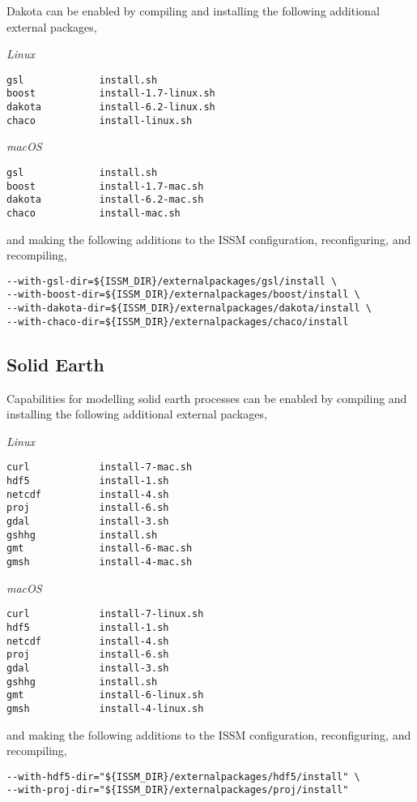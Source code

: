 Dakota can be enabled by compiling and installing the following additional external packages,

\emph{Linux}
\begin{lstlisting}
gsl				install.sh
boost			install-1.7-linux.sh
dakota			install-6.2-linux.sh
chaco			install-linux.sh
\end{lstlisting}

\emph{macOS}
\begin{lstlisting}
gsl				install.sh
boost			install-1.7-mac.sh
dakota			install-6.2-mac.sh
chaco			install-mac.sh
\end{lstlisting}

and making the following additions to the ISSM configuration, reconfiguring, and recompiling,

\begin{lstlisting}
--with-gsl-dir=${ISSM_DIR}/externalpackages/gsl/install \
--with-boost-dir=${ISSM_DIR}/externalpackages/boost/install \
--with-dakota-dir=${ISSM_DIR}/externalpackages/dakota/install \
--with-chaco-dir=${ISSM_DIR}/externalpackages/chaco/install
\end{lstlisting}

\subsection{Solid Earth}
Capabilities for modelling solid earth processes can be enabled by compiling and installing the following additional external packages,

\emph{Linux}
\begin{lstlisting}
curl			install-7-mac.sh
hdf5			install-1.sh
netcdf			install-4.sh
proj			install-6.sh
gdal			install-3.sh
gshhg			install.sh
gmt				install-6-mac.sh
gmsh			install-4-mac.sh
\end{lstlisting}

\emph{macOS}
\begin{lstlisting}
curl			install-7-linux.sh
hdf5			install-1.sh
netcdf			install-4.sh
proj			install-6.sh
gdal			install-3.sh
gshhg			install.sh
gmt				install-6-linux.sh
gmsh			install-4-linux.sh
\end{lstlisting}

and making the following additions to the ISSM configuration, reconfiguring, and recompiling,

\begin{lstlisting}
--with-hdf5-dir="${ISSM_DIR}/externalpackages/hdf5/install" \
--with-proj-dir="${ISSM_DIR}/externalpackages/proj/install"
\end{lstlisting}

